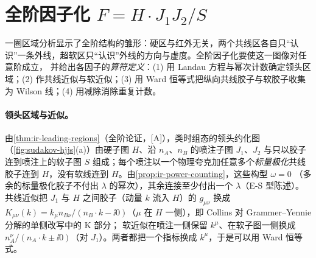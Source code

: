 \section{全阶因子化 \texorpdfstring{$F=H\cdot J_1J_2/S$}{F = H J1 J2 / S}}\label{sec:sudakov-factorization}

一圈区域分析显示了全阶结构的雏形：硬区与红外无关，两个共线区各自只“认识”一条外线，超软区只“认识”外线的方向与虚度。全阶因子化要使这一图像对任意阶成立，
并给出各因子的\emph{算符定义}：(1) 用 Landau 方程与幂次计数确定领头区域；(2) 作共线近似与软近似；(3) 用 Ward 恒等式把纵向共线胶子与软胶子收集为 Wilson 线；(4) 用减除消除重复计数。

\paragraph{领头区域与近似。}由\cref{thm:ir-leading-regions}（全阶论证，[A]），类时组态的领头约化图（\cref{fig:sudakov-hjjs}(a)）由硬子图 $H$、沿 $n_A$、$n_B$ 的喷注子图 $J_1$、$J_2$
与只以胶子连到喷注上的软子图 $S$ 组成；每个喷注以一个物理夸克加任意多个\emph{标量极化}共线胶子连到 $H$，没有软线连到 $H$。由\cref{prop:ir-power-counting}，这些构型 $\omega=0$
（多余的标量极化胶子不付出 $\lambda$ 的幂次），其余连接至少付出一个 $\lambda$（E-S 型陈述）。共线近似把 $J_1$ 与 $H$ 之间胶子（动量 $k$ 流入 $H$）的 $g_{\mu\nu}$ 换成
$K_{\mu\nu}(k)=k_\mu n_{B\nu}/(n_B\cdot k-\ii0)$（$\mu$ 在 $H$ 一侧），即 Collins 对 Grammer--Yennie 分解\cite{GrammerYennie1973}的单侧改写中的 K 部分\cite[第~10.6~节]{Collins2011}；
软近似在喷注一侧保留 $k^\mu$、在软子图一侧换成 $n_A^\nu/(n_A\cdot k\pm\ii0)$（对 $J_1$）。两者都把一个指标换成 $k^\mu$，于是可以用 Ward 恒等式。

